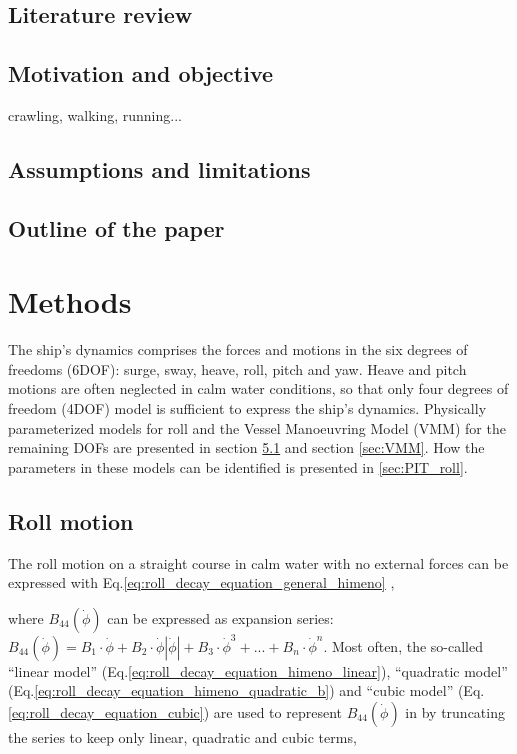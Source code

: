 \section{Literature review}


\section{Motivation and objective}

crawling, walking, running...

\section{Assumptions and limitations}

\section{Outline of the paper}


\chapter{Methods\label{ch:methods}}
The ship's dynamics comprises the forces and motions in the six degrees of freedoms (6DOF): surge, sway, heave, roll, pitch and yaw. Heave and pitch motions are often neglected in calm water conditions, so that only four degrees of freedom (4DOF) model is sufficient to express the ship's dynamics. Physically parameterized models for roll and the Vessel Manoeuvring Model (VMM) for the remaining DOFs are presented in section \ref{sec:roll} and section \ref{sec:VMM}. How the parameters in these models can be identified is presented in \ref{sec:PIT_roll}.

\section{Roll motion} \label{sec:roll}

The roll motion on a straight course in calm water with no external forces can be expressed with Eq.\ref{eq:roll_decay_equation_general_himeno} \cite{himeno_prediction_1981},


\noindent where $B_{44}\left(\dot{\phi}\right)$ can be expressed as expansion series:  
$ B_{44}\left(\dot{\phi}\right) = B_1\cdot\dot{\phi} + B_2\cdot\dot{\phi}\left|\dot{\phi}\right| + B_3\cdot\dot{\phi}^3 + ... + B_n\cdot\dot{\phi}^n$. Most often, the so-called ``linear model'' (Eq.\ref{eq:roll_decay_equation_himeno_linear}), ``quadratic model'' (Eq.\ref{eq:roll_decay_equation_himeno_quadratic_b}) and ``cubic model'' (Eq.\ref{eq:roll_decay_equation_cubic}) are used to represent $B_{44}(\dot{\phi})$ in by truncating the series to keep only linear, quadratic and cubic terms,

